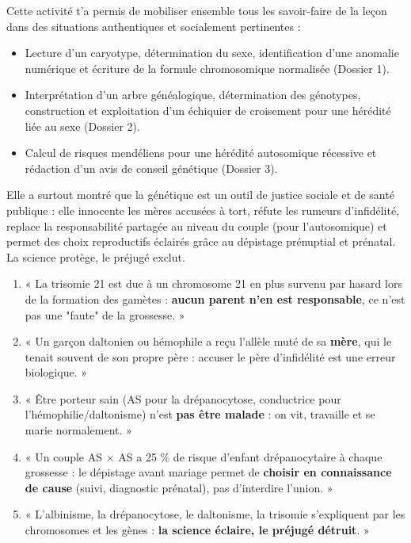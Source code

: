 \documentclass[11pt]{article}
\newcommand{\cle}[1]{{\popxbold\color{popdark}#1}}
\newcounter{popsec}
\newcounter{popsub}
\newcommand{\courssub}[1]{%
  \stepcounter{popsub}%
  \par\vspace{9pt}\noindent{\popxbold\fontsize{11.5}{13}\selectfont\color{popink}{\color{poporange}\thepopsec.\thepopsub}\hspace{6pt}#1}\par\nopagebreak\vspace{4pt}
}
\begin{document}
\courssub{Bilan de l'activité}

Cette activité t'a permis de mobiliser ensemble tous les savoir-faire de la leçon dans des situations authentiques et socialement pertinentes :
\begin{itemize}
\item Lecture d'un caryotype, détermination du sexe, identification d'une anomalie numérique et écriture de la formule chromosomique normalisée (Dossier 1).
\item Interprétation d'un arbre généalogique, détermination des génotypes, construction et exploitation d'un échiquier de croisement pour une hérédité liée au sexe (Dossier 2).
\item Calcul de risques mendéliens pour une hérédité autosomique récessive et rédaction d'un avis de conseil génétique (Dossier 3).
\end{itemize}
Elle a surtout montré que la génétique est un outil de \cle{justice sociale} et de \cle{santé publique} : elle innocente les mères accusées à tort, réfute les rumeurs d'infidélité, replace la responsabilité partagée au niveau du couple (pour l'autosomique) et permet des choix reproductifs éclairés grâce au dépistage prénuptial et prénatal. La science protège, le préjugé exclut.

\begin{exemplebox}
\begin{enumerate}
\item « La trisomie 21 est due à un chromosome 21 en plus survenu par hasard lors de la formation des gamètes : \textbf{aucun parent n'en est responsable}, ce n'est pas une "faute" de la grossesse. »
\item « Un garçon daltonien ou hémophile a reçu l'allèle muté de sa \textbf{mère}, qui le tenait souvent de son propre père : accuser le père d'infidélité est une erreur biologique. »
\item « Être porteur sain (AS pour la drépanocytose, conductrice pour l'hémophilie/daltonisme) n'est \textbf{pas être malade} : on vit, travaille et se marie normalement. »
\item « Un couple AS $\times$ AS a 25 \% de risque d'enfant drépanocytaire à chaque grossesse : le dépistage avant mariage permet de \textbf{choisir en connaissance de cause} (suivi, diagnostic prénatal), pas d'interdire l'union. »
\item « L'albinisme, la drépanocytose, le daltonisme, la trisomie s'expliquent par les chromosomes et les gènes : \textbf{la science éclaire, le préjugé détruit}. »
\end{enumerate}
\end{exemplebox}
\end{document}

